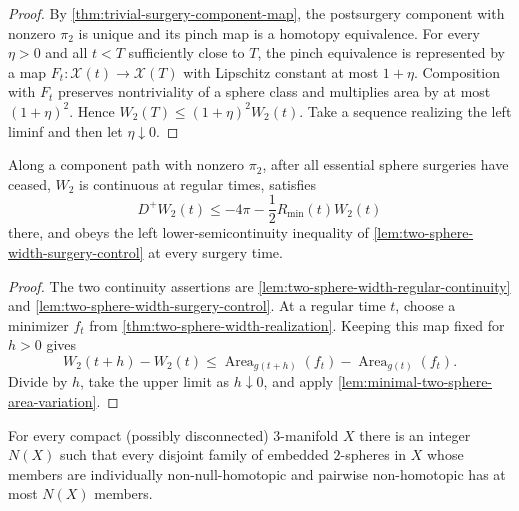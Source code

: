\begin{proof}
By \ref{thm:trivial-surgery-component-map}, the postsurgery component with
nonzero $\pi_2$ is unique and its pinch map is a homotopy equivalence.  For
every $\eta>0$ and all
$t<T$ sufficiently close to $T$, the pinch equivalence is represented by a
map $F_t\colon\mathcal X(t)\to\mathcal X(T)$ with Lipschitz constant at most
$1+\eta$.  Composition with $F_t$ preserves nontriviality of
a sphere class and multiplies area by at most $(1+\eta)^2$.  Hence
$W_2(T)\le(1+\eta)^2W_2(t)$.  Take a sequence realizing the left liminf and
then let $\eta\downarrow0$.
\end{proof}

\begin{lemma}
\label{lem:two-sphere-width-forward-inequality}
\notready
Along a component path with nonzero $\pi_2$, after all essential sphere
surgeries have ceased, $W_2$ is continuous at regular times, satisfies
\[
 D^+W_2(t)\le-4\pi-\frac12R_{\min}(t)W_2(t)
\]
there, and obeys the left lower-semicontinuity inequality of
\ref{lem:two-sphere-width-surgery-control} at every surgery time.
\end{lemma}

\begin{proof}
The two continuity assertions are
\ref{lem:two-sphere-width-regular-continuity} and
\ref{lem:two-sphere-width-surgery-control}.  At a regular time $t$, choose a
minimizer $f_t$ from \ref{thm:two-sphere-width-realization}.  Keeping this
map fixed for $h>0$ gives
\[
 W_2(t+h)-W_2(t)
 \le\operatorname{Area}_{g(t+h)}(f_t)-\operatorname{Area}_{g(t)}(f_t).
\]
Divide by $h$, take the upper limit as $h\downarrow0$, and apply
\ref{lem:minimal-two-sphere-area-variation}.
\end{proof}

\begin{lemma}
\label{lem:essential-sphere-family-finiteness}
\notready
For every compact (possibly disconnected) $3$-manifold $X$ there is an
integer $N(X)$ such that every disjoint family of embedded $2$-spheres in
$X$ whose members are individually non-null-homotopic and pairwise
non-homotopic has at most $N(X)$ members.
\end{lemma}


